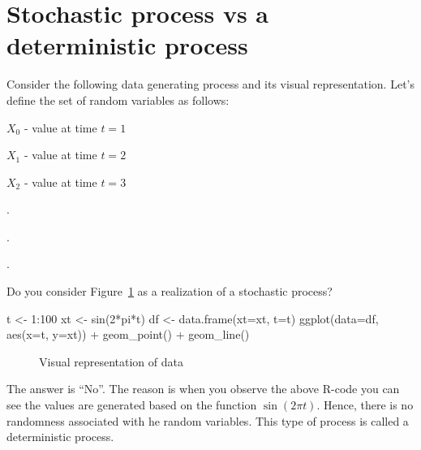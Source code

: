 \documentclass[
  letterpaper,
  DIV=11,
  numbers=noendperiod]{scrreprt}
\newenvironment{Shaded}{\begin{snugshade}}{\end{snugshade}}
\newcommand{\AttributeTok}[1]{\textcolor[rgb]{0.40,0.45,0.13}{#1}}
\newcommand{\DecValTok}[1]{\textcolor[rgb]{0.68,0.00,0.00}{#1}}
\newcommand{\FunctionTok}[1]{\textcolor[rgb]{0.28,0.35,0.67}{#1}}
\newcommand{\NormalTok}[1]{\textcolor[rgb]{0.00,0.23,0.31}{#1}}
\newcommand{\OtherTok}[1]{\textcolor[rgb]{0.00,0.23,0.31}{#1}}
\newcommand{\SpecialCharTok}[1]{\textcolor[rgb]{0.37,0.37,0.37}{#1}}
\begin{document}
\section{Stochastic process vs a deterministic
process}\label{stochastic-process-vs-a-deterministic-process}

Consider the following data generating process and its visual
representation. Let's define the set of random variables as follows:

\(X_0\) - value at time \(t=1\)

\(X_1\) - value at time \(t=2\)

\(X_2\) - value at time \(t=3\)

.

.

.

Do you consider Figure~\ref{fig-plot2} as a realization of a stochastic
process?

\begin{Shaded}
\begin{Highlighting}[]
\NormalTok{t }\OtherTok{\textless{}{-}} \DecValTok{1}\SpecialCharTok{:}\DecValTok{100}
\NormalTok{xt }\OtherTok{\textless{}{-}} \FunctionTok{sin}\NormalTok{(}\DecValTok{2}\SpecialCharTok{*}\NormalTok{pi}\SpecialCharTok{*}\NormalTok{t)}
\NormalTok{df }\OtherTok{\textless{}{-}} \FunctionTok{data.frame}\NormalTok{(}\AttributeTok{xt=}\NormalTok{xt, }\AttributeTok{t=}\NormalTok{t)}
\FunctionTok{ggplot}\NormalTok{(}\AttributeTok{data=}\NormalTok{df, }\FunctionTok{aes}\NormalTok{(}\AttributeTok{x=}\NormalTok{t, }\AttributeTok{y=}\NormalTok{xt)) }\SpecialCharTok{+} 
  \FunctionTok{geom\_point}\NormalTok{() }\SpecialCharTok{+} 
  \FunctionTok{geom\_line}\NormalTok{()}
\end{Highlighting}
\end{Shaded}

\begin{figure}[H]


\caption{\label{fig-plot2}Visual representation of data}

\end{figure}%

The answer is ``No''. The reason is when you observe the above R-code
you can see the values are generated based on the function
\(\sin(2 \pi t)\). Hence, there is no randomness associated with he
random variables. This type of process is called a deterministic
process.
\end{document}
